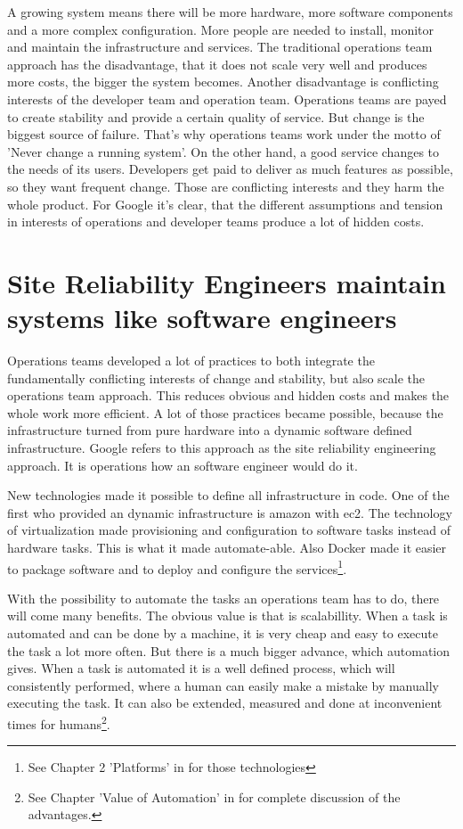 A growing system means there will be more hardware, more software components and a more complex configuration. More people are needed to install, monitor and maintain the infrastructure and services. The traditional operations team approach has the disadvantage, that it does not scale very well and produces more costs, the bigger the system becomes. Another disadvantage is conflicting interests of the developer team and operation team. Operations teams are payed to create stability and provide a certain quality of service. But change is the biggest source of failure\cite[p.10]{site_reliability}. That's why operations teams work under the motto of 'Never change a running system'. On the other hand, a good service changes to the needs of its users. Developers get paid to deliver as much features as possible, so they want frequent change. Those are conflicting interests and they harm the whole product. For Google it's clear, that the different assumptions and tension in interests of operations and developer teams produce a lot of hidden costs.

\section{Site Reliability Engineers maintain systems like software engineers}

Operations teams developed a lot of practices to both integrate the fundamentally conflicting interests of change and stability, but also scale the operations team approach. This reduces obvious and hidden costs and makes the whole work more efficient. A lot of those practices became possible, because the infrastructure turned from pure hardware into a dynamic software defined infrastructure. Google refers to this approach as the site reliability engineering approach. It is operations how an software engineer would do it.

New technologies made it possible to define all infrastructure in code. One of the first who provided an dynamic infrastructure is amazon with ec2. The technology of virtualization made provisioning and configuration to software tasks instead of hardware tasks. This is what it made automate-able. Also Docker made it easier to package software and to deploy and configure the services\footnote{See Chapter 2 'Platforms' in \cite{infra_as_code} for those technologies}.

With the possibility to automate the tasks an operations team has to do, there will come many benefits. The obvious value is that is scalabillity. When a task is automated and can be done by a machine, it is very cheap and easy to execute the task a lot more often. But there is a much bigger advance, which automation gives. When a task is automated it is a well defined process, which will consistently performed, where a human can easily make a mistake by manually executing the task. It can also be extended, measured and done at inconvenient times for humans\footnote{See Chapter 'Value of Automation' in \cite{site_reliability} for complete discussion of the advantages.}.

